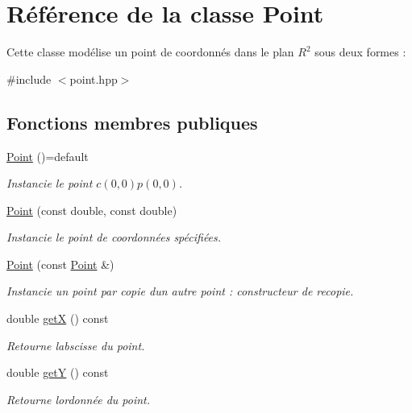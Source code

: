 \hypertarget{classPoint}{}\section{Référence de la classe Point}
\label{classPoint}


Cette classe modélise un point de coordonnés dans le plan $ R^2 $ sous deux formes \+:  




{\ttfamily \#include $<$point.\+hpp$>$}

\subsection*{Fonctions membres publiques}
\begin{DoxyCompactItemize}
\item 
\hyperlink{classPoint_a257415ad611a16bb73628efcdb87d0fd}{Point} ()=default
\begin{DoxyCompactList}\small\item\em Instancie le point $c(0, 0) p(0, 0)$. \end{DoxyCompactList}\item 
\hyperlink{classPoint_a370ac864b989b581ce00c674d722d77d}{Point} (const double, const double)
\begin{DoxyCompactList}\small\item\em Instancie le point de coordonnées spécifiées. \end{DoxyCompactList}\item 
\hyperlink{classPoint_a5b7ec0fb127734c1cd5c6f350a3990fc}{Point} (const \hyperlink{classPoint}{Point} \&)
\begin{DoxyCompactList}\small\item\em Instancie un point par copie d\textquotesingle{}un autre point \+: constructeur de recopie. \end{DoxyCompactList}\item 
double \hyperlink{classPoint_af52a20a376f8f31e87658837565d3812}{get\+X} () const 
\begin{DoxyCompactList}\small\item\em Retourne l\textquotesingle{}abscisse du point. \end{DoxyCompactList}\item 
double \hyperlink{classPoint_aac5008459bf0e0053ce744a69187bae7}{get\+Y} () const 
\begin{DoxyCompactList}\small\item\em Retourne l\textquotesingle{}ordonnée du point. \end{DoxyCompactList}\item 

\end{DoxyCompactItemize}
